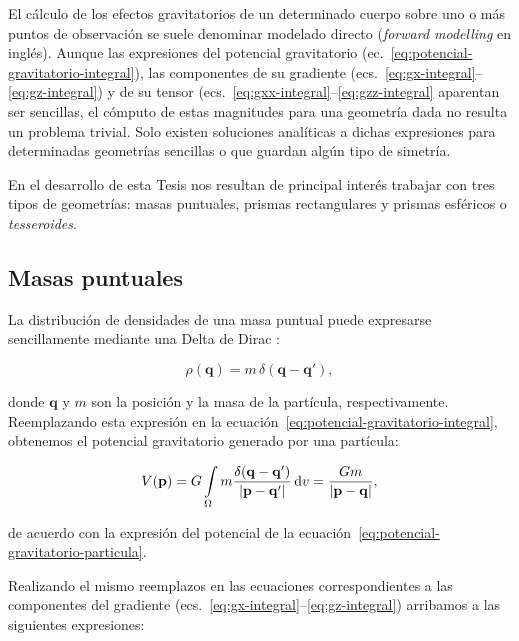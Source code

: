 El cálculo de los efectos gravitatorios de un determinado cuerpo sobre uno
o más puntos de observación se suele denominar modelado directo (\emph{forward
modelling} en inglés).
Aunque las expresiones del potencial gravitatorio
(ec.~\ref{eq:potencial-gravitatorio-integral}),
las componentes de su gradiente
(ecs.~\ref{eq:gx-integral}--\ref{eq:gz-integral})
y de su tensor (ecs.~\ref{eq:gxx-integral}--\ref{eq:gzz-integral}
aparentan ser sencillas, el cómputo de estas magnitudes para una geometría dada
no resulta un problema trivial.
Solo existen soluciones analíticas a dichas expresiones para determinadas
geometrías sencillas o que guardan algún tipo de simetría.

En el desarrollo de esta Tesis nos resultan de principal interés trabajar con
tres tipos de geometrías: masas puntuales, prismas rectangulares y prismas
esféricos o \emph{tesseroides}.

\subsection{Masas puntuales}

La distribución de densidades de una masa puntual puede expresarse
sencillamente mediante una Delta de Dirac \citep{vladimirov1979}:

\begin{equation}
    \rho(\mathbf{q}) = m \, \delta(\mathbf{q} - \mathbf{q'}),
\end{equation}

\noindent donde $\mathbf{q}$ y $m$ son la posición y la masa de la partícula,
respectivamente.
Reemplazando esta expresión en la
ecuación~\ref{eq:potencial-gravitatorio-integral}, obtenemos el potencial
gravitatorio generado por una partícula:

\begin{equation}
    V(\mathbf{p}) =
        G \int\limits_\Omega
        m \frac{\delta(\mathbf{q} - \mathbf{q'})}{|\mathbf{p} - \mathbf{q'}|}
        \mathop{}\!\textnormal{d} v =
        \frac{G m}{|\mathbf{p} - \mathbf{q}|},
    \label{eq:potencial-masa-puntual}
\end{equation}

\noindent de acuerdo con la expresión del potencial de la
ecuación~\ref{eq:potencial-gravitatorio-particula}.

Realizando el mismo reemplazos en las ecuaciones correspondientes a las
componentes del gradiente (ecs.~\ref{eq:gx-integral}--\ref{eq:gz-integral})
arribamos a las siguientes expresiones:

